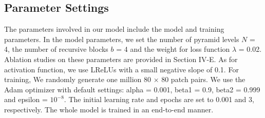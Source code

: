\documentclass[journal]{IEEEtran}
\begin{document}
\subsection{Parameter Settings}
The parameters involved in our model include the model and training parameters. In the model parameters, we set the number of pyramid levels \(N\) = 4, the number of recursive blocks \(b\) = 4 and the weight for loss function \(\lambda\) = 0.02. Ablation studies on these parameters are provided in Section IV-E. As for activation function, we use LReLUs with a small negative slope of 0.1. For training, We randomly generate one million 80 \(\times\) 80 patch pairs. We use the Adam optimizer \cite{kingma2014adam} with default settings: alpha = 0.001, beta1 = 0.9, beta2 = 0.999 and epsilon = \(10^{-8}\). The initial learning rate and epochs are set to 0.001 and 3, respectively. The whole model is trained in an end-to-end manner.








\end{document}
